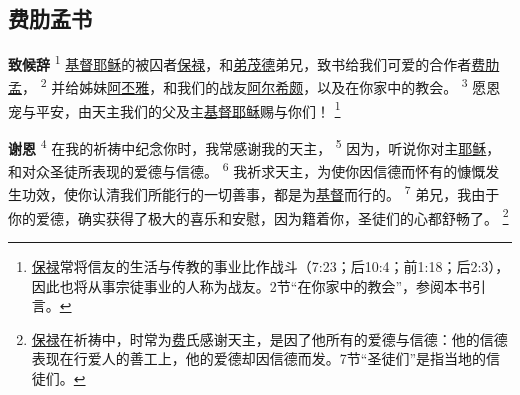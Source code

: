 \setlength\columnsep{0.6cm}
\begin{multicols}{2}

\chapter*{费肋孟书}


\textbf{致候辞\quad}
\textsuperscript{1}
\uline{基督}\uline{耶稣}的被囚者\uline{保禄}，和\uline{弟茂德}弟兄，致书给我们可爱的合作者\uline{费肋孟}，
\textsuperscript{2}
并给姊妹\uline{阿丕雅}，和我们的战友\uline{阿尔希颇}，以及在你家中的教会。
\textsuperscript{3}
愿恩宠与平安，由天主我们的父及主\uline{基督}\uline{耶稣}赐与你们！
\renewcommand\thefootnote{\ding{\numexpr171+\value{footnote}}}
\footnote{\uline{保禄}常将信友的生活与传教的事业比作战斗（7:23；后10:4；前1:18；后2:3），因此也将从事宗徒事业的人称为战友。2节“在你家中的教会”，参阅本书引言。}

\textbf{谢恩\quad}
\textsuperscript{4}
在我的祈祷中纪念你时，我常感谢我的天主，
\textsuperscript{5}
因为，听说你对主\uline{耶稣}，和对众圣徒所表现的爱德与信德。
\textsuperscript{6}
我祈求天主，为使你因信德而怀有的慷慨发生功效，使你认清我们所能行的一切善事，都是为\uline{基督}而行的。
\textsuperscript{7}
弟兄，我由于你的爱德，确实获得了极大的喜乐和安慰，因为籍着你，圣徒们的心都舒畅了。
\footnote{\uline{保禄}在祈祷中，时常为\uline{费}氏感谢天主，是因了他所有的爱德与信德：他的信德表现在行爱人的善工上，他的爱德却因信德而发。7节“圣徒们”是指当地的信徒们。}


\end{multicols}
